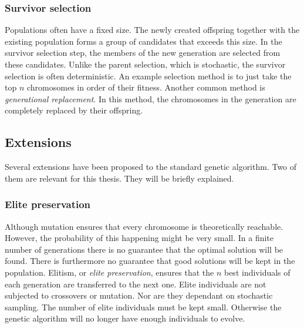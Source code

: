 \subsubsection{Survivor selection}
Populations often have a fixed size. The newly created offspring together with
the existing population forms a group of candidates that exceeds this size. In
the survivor selection step, the members of the new generation are selected
from these candidates. Unlike the parent selection, which is stochastic, the
survivor selection is often deterministic. An example selection method is to
just take the top $n$ chromosomes in order of their fitness. Another common
method is \emph{generational replacement}. In this method, the chromosomes in
the generation are completely replaced by their offspring.
\subsection{Extensions}
Several extensions have been proposed to the standard genetic algorithm. Two of
them are relevant for this thesis. They will be briefly explained.
\subsubsection{Elite preservation}
Although mutation ensures that every chromosome is theoretically reachable.
However, the probability of this happening might be very small. In a finite
number of generations there is no guarantee that the optimal solution will be
found. There is furthermore no guarantee that good solutions will be kept in
the population. Elitism, or \emph{elite preservation}, ensures that the $n$
best individuals of each generation are transferred to the next one. Elite
individuals are not subjected to crossovers or mutation. Nor are they dependant
on stochastic sampling. The number of elite individuals must be kept small.
Otherwise the genetic algorithm will no longer have enough individuals to evolve.
